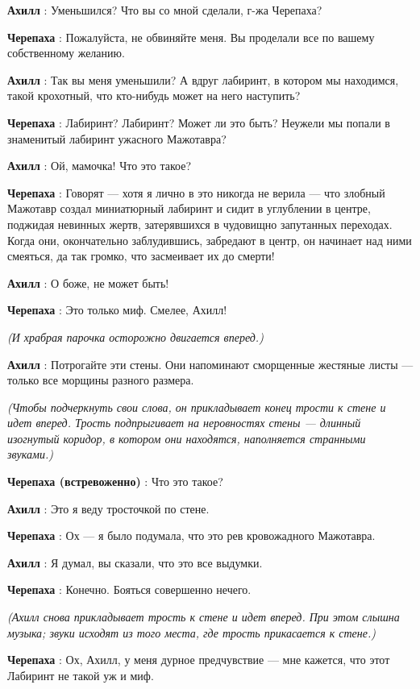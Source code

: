 \textbf{Ахилл} : Уменьшился? Что вы со мной сделали, г-жа Черепаха?

\textbf{Черепаха} : Пожалуйста, не обвиняйте меня. Вы проделали все по вашему собственному желанию.

\textbf{Ахилл} : Так вы меня уменьшили? А вдруг лабиринт, в котором мы находимся, такой крохотный, что кто-нибудь может на него наступить?

\textbf{Черепаха} : Лабиринт? Лабиринт? Может ли это быть? Неужели мы попали в знаменитый лабиринт ужасного Мажотавра?

\textbf{Ахилл} : Ой, мамочка! Что это такое?

\textbf{Черепаха} : Говорят --- хотя я лично в это никогда не верила --- что злобный Мажотавр создал миниатюрный лабиринт и сидит в углублении в центре, поджидая невинных жертв, затерявшихся в чудовищно запутанных переходах. Когда они, окончательно заблудившись, забредают в центр, он начинает над ними смеяться, да так громко, что засмеивает их до смерти!

\textbf{Ахилл} : О боже, не может быть!

\textbf{Черепаха} : Это только миф. Смелее, Ахилл!

\emph{(И храбрая парочка осторожно двигается вперед.)}

\textbf{Ахилл} : Потрогайте эти стены. Они напоминают сморщенные жестяные листы --- только все морщины разного размера.

\emph{(Чтобы подчеркнуть свои слова, он прикладывает конец трости к стене и идет вперед. Трость подпрыгивает на неровностях стены --- длинный изогнутый коридор, в котором они находятся, наполняется странными звуками.)}

\textbf{Черепаха (встревоженно)} : Что это такое?

\textbf{Ахилл} : Это я веду тросточкой по стене.

\textbf{Черепаха} : Ох --- я было подумала, что это рев кровожадного Мажотавра.

\textbf{Ахилл} : Я думал, вы сказали, что это все выдумки.

\textbf{Черепаха} : Конечно. Бояться совершенно нечего.

\emph{(Ахилл снова прикладывает трость к стене и идет вперед. При этом слышна музыка; звуки исходят из того места, где трость прикасается к стене.)}

\textbf{Черепаха} : Ох, Ахилл, у меня дурное предчувствие --- мне кажется, что этот Лабиринт не такой уж и миф.

